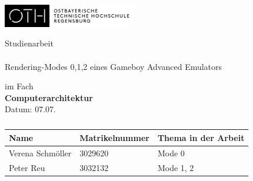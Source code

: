 \begin{titlepage}

\includegraphics[height=10mm]{img/OTHLogo.jpg}

\vspace{10mm}

\begin{center}
\Huge Studienarbeit \\ 
\large \ \\
\Large Rendering-Modes 0,1,2 eines Gameboy Advanced Emulators 

\vspace{20mm}

im Fach \\
\textbf{Computerarchitektur} \\

Datum: 07.07.\the\year
\vspace{70mm}

\end{center}
\begin{table}[h]
\centering
\begin{tabular}{|l|l|l|}
\hline
\textbf{Name}    & \textbf{Matrikelnummer} & \textbf{Thema in der Arbeit} \\ \hline
Verena Schmöller & 3029620                 & Mode 0                       \\ \hline
Peter Reu        & 3032132                 & Mode 1, 2                    \\ \hline
\end{tabular}
\captionsetup{labelformat=empty}
\caption{ }
\label{Teammitglieder}
\end{table}






\end{titlepage}